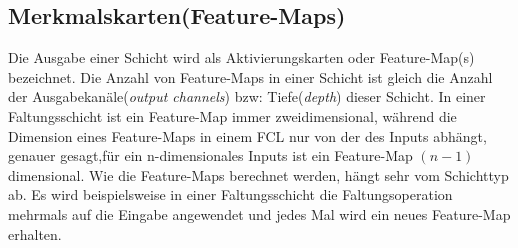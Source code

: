 \documentclass[12pt,a4paper]{scrartcl}
\numberwithin{equation}{section}
\begin{document}
\subsection{Merkmalskarten(Feature-Maps)}
Die Ausgabe einer Schicht wird als Aktivierungskarten oder Feature-Map(s) bezeichnet. Die Anzahl von Feature-Maps in einer Schicht ist gleich die Anzahl der Ausgabekanäle(\textit{output channels}) bzw: Tiefe(\textit{depth}) dieser Schicht.
In einer Faltungsschicht ist ein Feature-Map immer zweidimensional, während die Dimension eines Feature-Maps in einem \ac{FCL} nur von der des Inputs abhängt, genauer gesagt,für ein n-dimensionales Inputs ist ein Feature-Map $ (n-1) $dimensional.
Wie die Feature-Maps berechnet werden, hängt sehr vom Schichttyp ab. Es wird beispielsweise in einer Faltungsschicht die Faltungsoperation mehrmals auf die Eingabe angewendet und jedes Mal wird ein neues Feature-Map erhalten.
\end{document}

